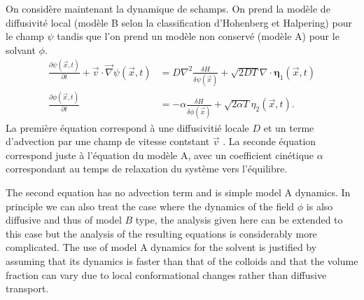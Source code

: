 On considère maintenant la dynamique de schamps. On prend la modèle de diffusivité local (modèle B selon la classification d'Hohenberg et Halpering) pour le champ $\psi$ tandis que l'on prend un modèle non conservé (modèle A) pour le solvant $\phi$.
\begin{align}
    \frac{\partial \psi(\vec{x},t)}{\partial t} +\vec{v}\cdot \vec{ \nabla}\psi(\vec{x},t)&= D\nabla^2\frac{\delta H}{\delta \psi(\vec{x})}+ \sqrt{2D T}\nabla \cdot {\bm \eta}_1(\vec{x},t) \\
    \frac{\partial \phi(\vec{x},t)}{\partial t} &= -\alpha\frac{\delta H}{\delta \phi(\vec{x})}+ \sqrt{2\alpha T}{ \eta}_2(\vec{x},t).
\end{align}
La première équation correspond à une diffusivitié locale $D$ et un terme d'advection par une champ de vitesse contstant $\vec{v}$ . La seconde équation correspond juste à l'équation du modèle A, avec un coefficient cinétique $\alpha$ correspondant au temps de relaxation du système vers l'équilibre. 


The second equation has no advection term and is simple model A dynamics. In principle we can also treat the case where the dynamics of the field $\phi$ is also diffusive and thus of model $B$ type, the analysis given here can be extended to this case but the analysis of the resulting equations is considerably more complicated. The use of model A dynamics for the solvent is justified by assuming that its dynamics is faster than that of the colloids and that the volume fraction can vary due to local conformational changes rather than  diffusive transport.


